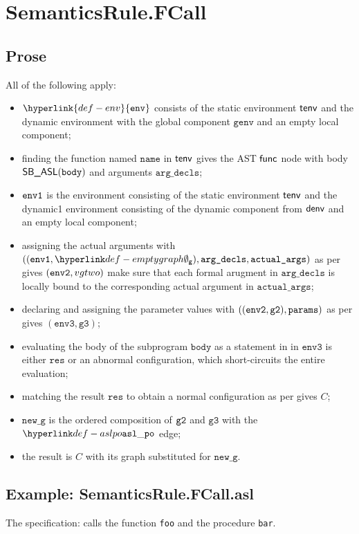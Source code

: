 \documentclass{book}
\newcommand\ProseOrAbnormal[0]{or an abnormal configuration, which short-circuits the entire evaluation}
\newcommand\env[0]{\hyperlink{def-env}{\texttt{env}}}
\newcommand\envthree[0]{\texttt{env3}}
\newcommand\newg[0]{\texttt{new\_g}}
\newcommand\vres[0]{\texttt{res}}
\newcommand\vgthree[0]{\texttt{g3}}
\newcommand\name[0]{\texttt{name}}
\newcommand\actualargs[0]{\texttt{actual\_args}}
\newcommand\argdecls[0]{\texttt{arg\_decls}}
\newcommand\params[0]{\texttt{params}}
\newcommand\vbody[0]{\texttt{body}}
\newcommand\genv[0]{\texttt{genv}}
\begin{document}

\section{SemanticsRule.FCall \label{sec:SemanticsRule.FCall}}
  \subsection{Prose}
  All of the following apply:
  \begin{itemize}
    \item $\env$ consists of the static environment $\textsf{tenv}$ and the dynamic environment with the global
    component $\genv$ and an empty local component;
    \item finding the function named $\name$ in $\textsf{tenv}$ gives the AST $\textsf{func}$ node with body
    $\SBASL(\vbody)$ and arguments $\argdecls$;
    \item $\texttt{env1}$ is the environment consisting of the static environment $\textsf{tenv}$ and the dynamic1
    environment consisting of the dynamic component from $\textsf{denv}$ and an empty local component;
    \item assigning the actual arguments with $((\envone, \emptygraph), \argdecls, \actualargs)$
    as per  gives $(\texttt{env2}, vgtwo)$ make sure that each
    formal arugment in $\argdecls$ is
    locally bound to the corresponding actual argument in $\actualargs$;
    \item declaring and assigning the parameter values with $((\envtwo, \vgtwo), \params)$
    as per  gives $(\envthree, \vgthree)$;
    \item evaluating the body of the subprogram $\vbody$ as a statement in in $\envthree$
    is either $\vres$ \ProseOrAbnormal;
    \item matching the result $\vres$ to obtain a normal configuration as per 
    gives $C$;
    \item $\newg$ is the ordered composition of $\texttt{g2}$ and $\vgthree$ with the $\aslpo$ edge;
    \item the result is $C$ with its graph substituted for $\newg$.
  \end{itemize}

  \subsection{Example: SemanticsRule.FCall.asl}
  The specification:
  calls the function \texttt{foo} and the procedure \texttt{bar}.
\end{document}
